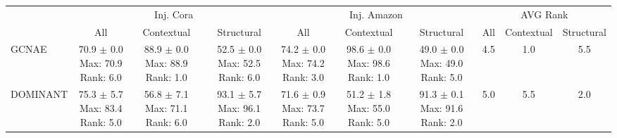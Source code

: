 \begin{longtable}{|l|c|c|c|c|c|c|c|c|c|}
\hline
 & \multicolumn{3}{|c|}{Inj. Cora} & \multicolumn{3}{|c|}{Inj. Amazon} & \multicolumn{3}{|c|}{AVG Rank} \\ \cline{2-10}
 & All & Contextual & Structural & All & Contextual & Structural & All & Contextual & Structural \\ \hline
GCNAE & \makecell{ 70.9 $\pm$ 0.0 \\ \scriptsize Max: 70.9 \\ \scriptsize Rank: 6.0 } & \makecell{ 88.9 $\pm$ 0.0 \\ \scriptsize Max: 88.9 \\ \scriptsize Rank: 1.0 } & \makecell{ 52.5 $\pm$ 0.0 \\ \scriptsize Max: 52.5 \\ \scriptsize Rank: 6.0 } & \makecell{ 74.2 $\pm$ 0.0 \\ \scriptsize Max: 74.2 \\ \scriptsize Rank: 3.0 } & \makecell{ 98.6 $\pm$ 0.0 \\ \scriptsize Max: 98.6 \\ \scriptsize Rank: 1.0 } & \makecell{ 49.0 $\pm$ 0.0 \\ \scriptsize Max: 49.0 \\ \scriptsize Rank: 5.0 } & 4.5 & 1.0 & 5.5 \\ \hline 
DOMINANT & \makecell{ 75.3 $\pm$ 5.7 \\ \scriptsize Max: 83.4 \\ \scriptsize Rank: 5.0 } & \makecell{ 56.8 $\pm$ 7.1 \\ \scriptsize Max: 71.1 \\ \scriptsize Rank: 6.0 } & \makecell{ 93.1 $\pm$ 5.7 \\ \scriptsize Max: 96.1 \\ \scriptsize Rank: 2.0 } & \makecell{ 71.6 $\pm$ 0.9 \\ \scriptsize Max: 73.7 \\ \scriptsize Rank: 5.0 } & \makecell{ 51.2 $\pm$ 1.8 \\ \scriptsize Max: 55.0 \\ \scriptsize Rank: 5.0 } & \makecell{ 91.3 $\pm$ 0.1 \\ \scriptsize Max: 91.6 \\ \scriptsize Rank: 2.0 } & 5.0 & 5.5 & 2.0 \\ \hline 

\end{longtable}
